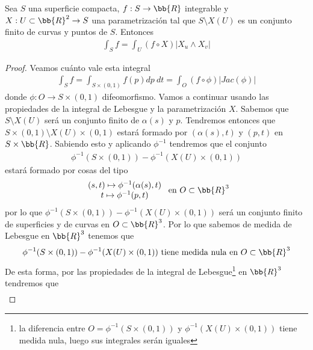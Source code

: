 \begin{prop}
    Sea $S$ una superficie compacta, $f:S\to \bb{R}$ integrable y $X: U \subset \bb{R}^2 \to S$ una parametrización tal que $S\setminus X(U)$ es un conjunto finito de curvas y puntos de $S$. Entonces
    \begin{gather*}
        \int_S f = \int_U (f\circ X)|X_u\wedge X_v|
    \end{gather*}

    \begin{proof}
        Veamos cuánto vale esta integral
        \begin{gather*}
            \int_S f = \int_{S \times(0,1)} f(p) dp \ dt = \int_O (f\circ \phi) |Jac(\phi)|
        \end{gather*}
        donde $\phi: O \to S\times(0,1)$ difeomorfismo. Vamos a continuar usando las propiedades de la integral de Lebesgue y la parametrización $X$. Sabemos que $S \setminus X(U)$ será un conjunto finito de $\alpha(s)$ y $p$. Tendremos entonces que $S \times (0,1) \setminus X(U)\times (0,1) $ estará formado por $(\alpha(s), t)$ y $(p,t)$ en $S\times \bb{R}$. Sabiendo esto y aplicando $\phi^{-1}$ tendremos que el conjunto
        \begin{gather*}
            \phi^{-1}(S \times (0,1)) - \phi^{-1}(X(U)\times(0,1))
        \end{gather*}
        estará formado por cosas del tipo
        \begin{gather*}
            \begin{array}{c}
                (s,t) \mapsto \phi^{-1}(\alpha(s), t) \\
                t \mapsto \phi^{-1}(p,t)
            \end{array}
            \text{ en } O\subset \bb{R}^3
        \end{gather*}
        por lo que $\phi^{-1}(S \times (0,1)) - \phi^{-1}(X(U)\times(0,1))$ será un conjunto finito de superficies y de curvas en $O\subset \bb{R}^3$. Por lo que sabemos de medida de Lebesgue en $\bb{R}^3$ tenemos que 
        \begin{gather*}
            \phi^{-1}(S \times (0,1)) - \phi^{-1}(X(U)\times(0,1)) \text{ tiene medida nula en $O\subset \bb{R}^3$}
        \end{gather*}
        De esta forma, por las propiedades de la integral de Lebesgue\footnote{la diferencia entre $O=\phi^{-1}(S\times(0,1))$ y $\phi^{-1}(X(U)\times(0,1))$ tiene medida nula, luego sus integrales serán iguales} en $\bb{R}^3$ tendremos que  
        \begin{gather*}

\end{gather*}
\end{proof}
\end{prop}
